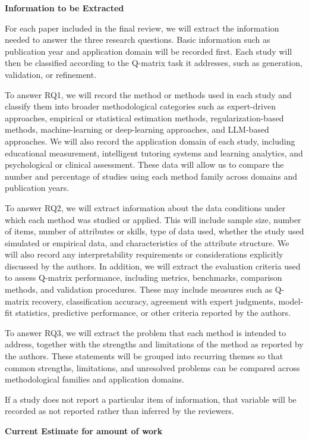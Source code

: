\documentclass[sigconf]{acmart}
\begin{document}
\textbf{Information to be Extracted }

For each paper included in the final review, we will extract the information needed to answer the three research questions. Basic information such as publication year and application domain will be recorded first. Each study will then be classified according to the Q-matrix task it addresses, such as generation, validation, or refinement.

To answer RQ1, we will record the method or methods used in each study and classify them into broader methodological categories such as expert-driven approaches, empirical or statistical estimation methods, regularization-based methods, machine-learning or deep-learning approaches, and LLM-based approaches. We will also record the application domain of each study, including educational measurement, intelligent tutoring systems and learning analytics, and psychological or clinical assessment. These data will allow us to compare the number and percentage of studies using each method family across domains and publication years.

To answer RQ2, we will extract information about the data conditions under which each method was studied or applied. This will include sample size, number of items, number of attributes or skills, type of data used, whether the study used simulated or empirical data, and characteristics of the attribute structure. We will also record any interpretability requirements or considerations explicitly discussed by the authors. In addition, we will extract the evaluation criteria used to assess Q-matrix performance, including metrics, benchmarks, comparison methods, and validation procedures. These may include measures such as Q-matrix recovery, classification accuracy, agreement with expert judgments, model-fit statistics, predictive performance, or other criteria reported by the authors.

To answer RQ3, we will extract the problem that each method is intended to address, together with the strengths and limitations of the method as reported by the authors. These statements will be grouped into recurring themes so that common strengths, limitations, and unresolved problems can be compared across methodological families and application domains.

If a study does not report a particular item of information, that variable will be recorded as not reported rather than inferred by the reviewers.

\textbf{Current Estimate for amount of work}
\end{document}
